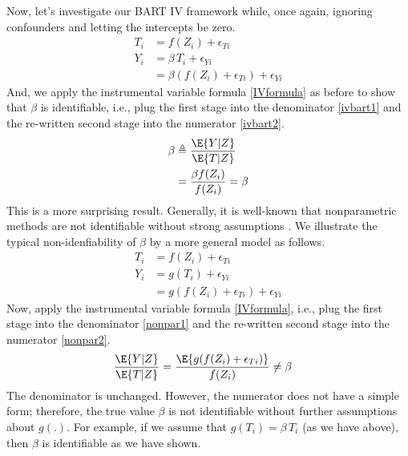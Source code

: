 Now, let's investigate our BART IV framework while, once again, ignoring
confounders and letting the intercepts be zero.
\begin{align}
T_i & =  f(Z_i) + \epsilon_{Ti} \label{ivbart1} \\
Y_i & =  \beta \, T_i + \epsilon_{Yi}  \nonumber \\
   & =  \beta (f(Z_i) + \epsilon_{Ti}) + \epsilon_{Yi} \label{ivbart2}
\end{align}
And, we apply the instrumental variable formula \eqref{IVformula} as
before to show that $\beta$ is identifiable, i.e., plug the first stage into
the denominator \eqref{ivbart1} and the re-written second stage into the
numerator \eqref{ivbart2}.
\begin{align*}
\beta & \triangleq \frac{\E{Y|Z}}{\E{T|Z}} \\
& = \frac{\beta f(Z_i) }{ f(Z_i) } = \beta
\end{align*}
This is a more surprising result.  Generally, it is well-known that
nonparametric methods are not identifiable without strong assumptions
\citep{ImbeAngr94,Pear09}.  We illustrate the typical non-idenfiability
of $\beta$ by a more general model as follows.
\begin{align}
T_i & =  f(Z_i) + \epsilon_{Ti} \label{nonpar1} \\
Y_i & =  g(T_i) + \epsilon_{Yi}  \nonumber \\
    & =  g(f(Z_i) + \epsilon_{Ti}) + \epsilon_{Yi} \label{nonpar2}
\end{align}
Now, apply the instrumental variable formula \eqref{IVformula}, i.e.,
plug the first stage into the denominator \eqref{nonpar1} and the
re-written second stage into the numerator \eqref{nonpar2}.
\begin{align*}
\frac{\E{Y|Z}}{\E{T|Z}} & = \frac{\E{g(f(Z_i) + \epsilon_{Ti})} }{ f(Z_i) } 
 \not= \beta
\end{align*}
The denominator is unchanged.  However, the numerator
does not have a simple form; therefore, the true
value $\beta$ is not identifiable without further assumptions
about $g(.)$.  For example, if we assume that $g(T_i)=\beta\, T_i$
(as we have above), then $\beta$ is identifiable as we have shown.

